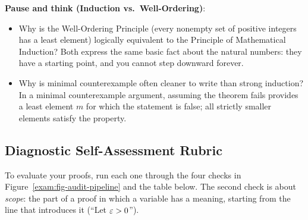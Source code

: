 \begin{recoverybox}
\textbf{Pause and think (Induction vs.\ Well-Ordering)}:
\begin{itemize}
  \item Why is the Well-Ordering Principle (every nonempty set of positive integers has a least element) logically equivalent to the Principle of Mathematical Induction? Both express the same basic fact about the natural numbers: they have a starting point, and you cannot step downward forever.
  \item Why is minimal counterexample often cleaner to write than strong induction? In a minimal counterexample argument, assuming the theorem fails provides a least element $m$ for which the statement is false; all strictly smaller elements satisfy the property.
\end{itemize}
\end{recoverybox}

\subsection{Diagnostic Self-Assessment Rubric}

To evaluate your proofs, run each one through the four checks in Figure~\ref{exam:fig-audit-pipeline} and the table below. The second check is about \emph{scope}: the part of a proof in which a variable has a meaning, starting from the line that introduces it (``Let $\varepsilon > 0$'').

